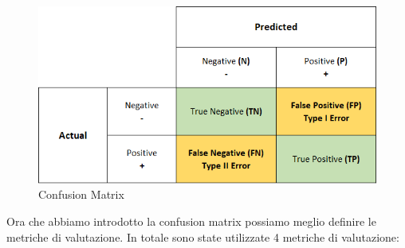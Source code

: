 \begin{figure}[H]
    \centering
    \includegraphics[width=0.5\linewidth]{confusion_matrix.png}
    \caption{Confusion Matrix}
    \label{fig:enter-label}
\end{figure}

Ora che abbiamo introdotto la confusion matrix possiamo meglio definire le metriche di valutazione. In totale sono state utilizzate 4 metriche di valutazione:

